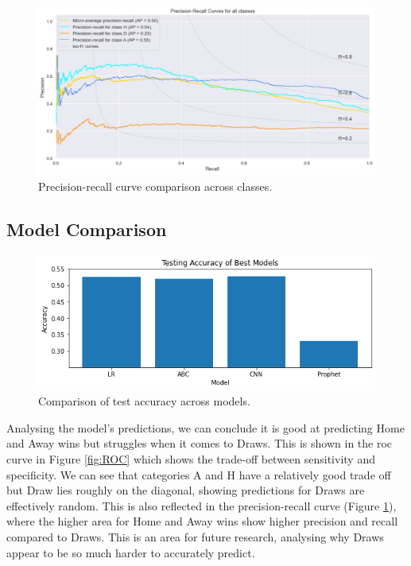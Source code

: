 \documentclass{article}
\begin{document}
\vspace{-1em}
\begin{figure}[!htb]
    \centering
    \includegraphics[width=0.9\linewidth]{Images/Figure 5.jpeg}
    \caption{Precision-recall curve comparison across classes.}
    \label{fig:precisionrecall}
\end{figure}

\subsection{Model Comparison} 
\label{modelcomparison}

\begin{figure}[!htb]
    \centering
    \includegraphics[width=0.7\linewidth]{Images/Figure 6.png}
    \caption{Comparison of test accuracy across models.}
    \label{fig:models}
\end{figure}

Analysing the model’s predictions, we can conclude it is good at predicting Home and Away wins but struggles when it comes to Draws. This is shown in the \gls{roc} curve in Figure \ref{fig:ROC} which shows the trade-off between sensitivity and specificity. We can see that categories A and H have a relatively good trade off but Draw lies roughly on the diagonal, showing predictions for Draws are effectively random. This is also reflected in the precision-recall curve (Figure \ref{fig:precisionrecall}), where the higher area for Home and Away wins show higher precision and recall compared to Draws. This is an area for future research, analysing why Draws appear to be so much harder to accurately predict. 
\end{document}
